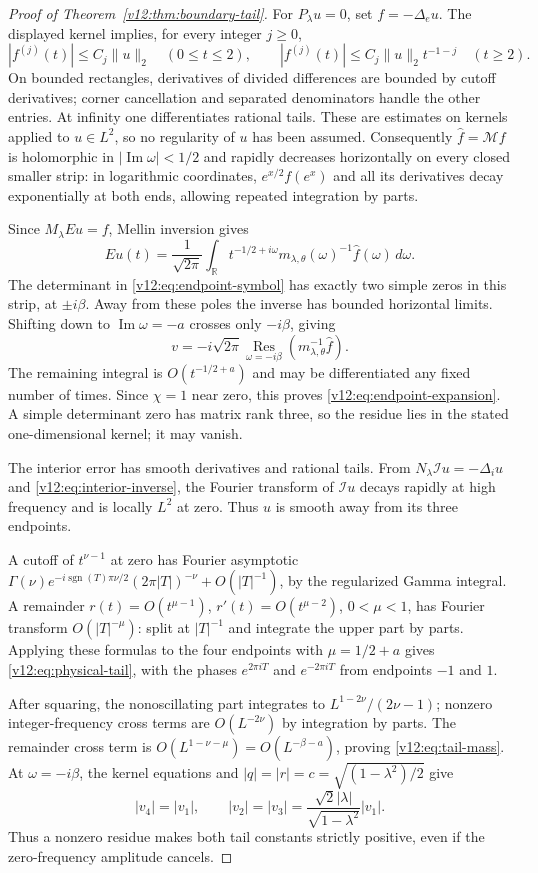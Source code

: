\begin{proof}[Proof of Theorem~\ref{v12:thm:boundary-tail}]
For $P_\lambda u=0$, set $f=-\Delta_eu$.  The displayed kernel implies,
for every integer $j\ge0$,
\[
 |f^{(j)}(t)|\le C_j\|u\|_2\quad(0\le t\le2),\qquad
 |f^{(j)}(t)|\le C_j\|u\|_2t^{-1-j}\quad(t\ge2).
\]
On bounded rectangles, derivatives of divided differences are bounded
by cutoff derivatives; corner cancellation and separated denominators
handle the other entries.  At infinity one differentiates rational
tails.  These are estimates on kernels applied to $u\in L^2$, so no
regularity of $u$ has been assumed.  Consequently
$\widehat f=\mathcal Mf$ is holomorphic in
$|\operatorname{Im}\omega|<1/2$ and rapidly decreases horizontally on
every closed smaller strip: in logarithmic coordinates,
$e^{x/2}f(e^x)$ and all its derivatives decay exponentially at both
ends, allowing repeated integration by parts.

Since $M_\lambda Eu=f$, Mellin inversion gives
\[
 Eu(t)=\frac1{\sqrt{2\pi}}\int_{\mathbb R}
 t^{-1/2+i\omega}m_{\lambda,\theta}(\omega)^{-1}
                     \widehat f(\omega)\,d\omega.
\]
The determinant in \eqref{v12:eq:endpoint-symbol} has exactly two simple
zeros in this strip, at $\pm i\beta$.  Away from these poles the inverse has bounded horizontal limits.
Shifting down to $\operatorname{Im}\omega=-a$ crosses only $-i\beta$, giving
\[
 v=-i\sqrt{2\pi}\operatorname*{Res}_{\omega=-i\beta}
                  (m_{\lambda,\theta}^{-1}\widehat f).
\]
The remaining integral is $O(t^{-1/2+a})$ and may be differentiated
any fixed number of times.  Since $\chi=1$ near zero, this proves
\eqref{v12:eq:endpoint-expansion}.  A simple determinant zero has matrix
rank three, so the residue lies in the stated one-dimensional kernel;
it may vanish.

The interior error has smooth derivatives and rational tails.
From $N_\lambda\mathcal Iu=-\Delta_i u$ and
\eqref{v12:eq:interior-inverse}, the Fourier transform of $\mathcal Iu$
decays rapidly at high frequency and is locally $L^2$ at zero.
Thus $u$ is smooth away from its three endpoints.

A cutoff of $t^{\nu-1}$ at zero has Fourier asymptotic
$\Gamma(\nu)e^{-i\operatorname{sgn}(T)\pi\nu/2}
(2\pi|T|)^{-\nu}+O(|T|^{-1})$, by the regularized Gamma integral.
A remainder $r(t)=O(t^{\mu-1})$, $r'(t)=O(t^{\mu-2})$, $0<\mu<1$,
has Fourier transform $O(|T|^{-\mu})$: split at $|T|^{-1}$ and integrate
the upper part by parts.  Applying these formulas to the four endpoints
with $\mu=1/2+a$ gives \eqref{v12:eq:physical-tail}, with the phases
$e^{2\pi iT}$ and $e^{-2\pi iT}$ from endpoints $-1$ and $1$.

After squaring, the nonoscillating part integrates to
$L^{1-2\nu}/(2\nu-1)$; nonzero integer-frequency cross terms are
$O(L^{-2\nu})$ by integration by parts.  The remainder cross term is
$O(L^{1-\nu-\mu})=O(L^{-\beta-a})$, proving
\eqref{v12:eq:tail-mass}.  At $\omega=-i\beta$, the kernel equations
and $|q|=|r|=c=\sqrt{(1-\lambda^2)/2}$ give
\[
 |v_4|=|v_1|,\qquad
 |v_2|=|v_3|=
          \frac{\sqrt2|\lambda|}{\sqrt{1-\lambda^2}}|v_1|.
\]
Thus a nonzero residue makes both tail constants strictly positive,
even if the zero-frequency amplitude cancels.
\end{proof}

